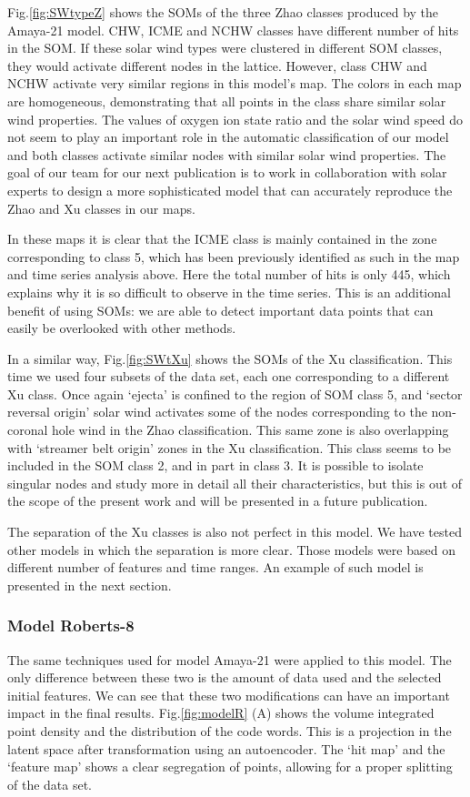 \documentclass[utf8]{frontiersSCNS} %
\begin{document}
Fig.\ref{fig:SWtypeZ} shows the SOMs of the three Zhao classes produced by the Amaya-21 model. CHW, ICME and NCHW classes have different number of hits in the SOM. If these solar wind types were clustered in different SOM classes, they would activate different nodes in the lattice. However, class CHW and NCHW activate very similar regions in this model's map. The colors in each map are homogeneous, demonstrating that all points in the class share similar solar wind properties. The values of oxygen ion state ratio and the solar wind speed do not seem to play an important role in the automatic classification of our model and both classes activate similar nodes with similar solar wind properties. The goal of our team for our next publication is to work in collaboration with solar experts to design a more sophisticated model that can accurately reproduce the Zhao and Xu classes in our maps.

In these maps it is clear that the ICME class is mainly contained in the zone corresponding to class 5, which has been previously identified as such in the map and time series analysis above. Here the total number of hits is only 445, which explains why it is so difficult to observe in the time series. This is an additional benefit of using SOMs: we are able to detect important data points that can easily be overlooked with other methods.

In a similar way, Fig.\ref{fig:SWtXu} shows the SOMs of the Xu classification. This time we used four subsets of the data set, each one corresponding to a different Xu class. Once again `ejecta' is confined to the region of SOM class 5, and `sector reversal origin' solar wind activates some of the nodes corresponding to the non-coronal hole wind in the Zhao classification. This same zone is also overlapping with `streamer belt origin' zones in the Xu classification. This class seems to be included in the SOM class 2, and in part in class 3. It is possible to isolate singular nodes and study more in detail all their characteristics, but this is out of the scope of the present work and will be presented in a future publication.

The separation of the Xu classes is also not perfect in this model. We have tested other models in which the separation is more clear. Those models were based on different number of features and time ranges. An example of such model is presented in the next section.

\subsubsection{Model Roberts-8}
The same techniques used for model Amaya-21 were applied to this model. The only difference between these two is the amount of data used and the selected initial features. We can see that these two modifications can have an important impact in the final results. Fig.\ref{fig:modelR} (A) shows the volume integrated point density and the distribution of the code words. This is a projection in the latent space after transformation using an autoencoder. The `hit map' and the `feature map' shows a clear segregation of points, allowing for a proper splitting of the data set.
\end{document}
